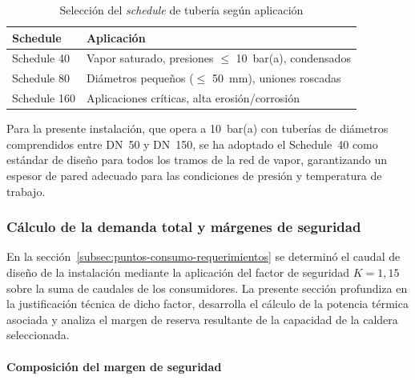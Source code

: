 \begin{table}[H]
	\centering
	\caption{Selección del \textit{schedule} de tubería según aplicación}
	\label{tab:schedule-aplicacion}
	\begin{tabular}{ll}
		\toprule
		\textbf{Schedule} & \textbf{Aplicación}                                     \\
		\midrule
		Schedule 40       & Vapor saturado, presiones $\leq$ 10~bar(a), condensados \\
		Schedule 80       & Diámetros pequeños ($\leq$ 50~mm), uniones roscadas     \\
		Schedule 160      & Aplicaciones críticas, alta erosión/corrosión           \\
		\bottomrule
	\end{tabular}
\end{table}

Para la presente instalación, que opera a 10~bar(a) con tuberías de diámetros comprendidos entre DN~50 y DN~150, se ha adoptado el Schedule~40 como estándar de diseño para todos los tramos de la red de vapor, garantizando un espesor de pared adecuado para las condiciones de presión y temperatura de trabajo.


\subsubsection{Cálculo de la demanda total y márgenes de seguridad}
\label{subsubsec:demanda-total-margenes}

En la sección~\ref{subsec:puntos-consumo-requerimientos} se determinó el caudal de diseño de la instalación mediante la aplicación del factor de seguridad $K = 1{,}15$ sobre la suma de caudales de los consumidores. La presente sección profundiza en la justificación técnica de dicho factor, desarrolla el cálculo de la potencia térmica asociada y analiza el margen de reserva resultante de la capacidad de la caldera seleccionada.

\paragraph{Composición del margen de seguridad}

